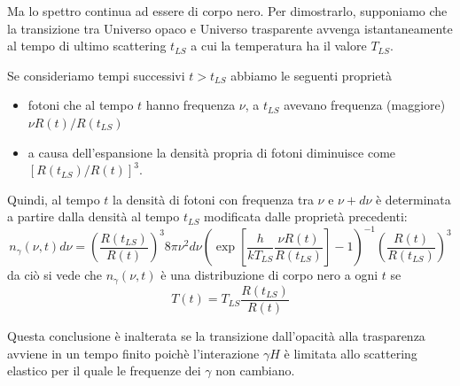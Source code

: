 Ma lo spettro continua ad essere di corpo nero. Per dimostrarlo, supponiamo che
la transizione tra Universo opaco e Universo trasparente avvenga istantaneamente
al tempo di ultimo scattering $t_{LS}$ a cui la temperatura ha il valore
$T_{LS}$.

Se consideriamo tempi successivi $t>t_{LS}$ abbiamo le seguenti proprietà
\begin{itemize}
\item fotoni che al tempo $t$ hanno frequenza $\nu$, a $t_{LS}$ avevano
  frequenza (maggiore) $\nu R(t)/R(t_{LS})$
\item a causa dell'espansione la densità propria di fotoni diminuisce come
  $[R(t_{LS})/R(t)]^3$.
\end{itemize}
Quindi, al tempo $t$ la densità di fotoni con frequenza tra $\nu$ e $\nu+d\nu$ è
determinata a partire dalla densità al tempo $t_{LS}$ modificata dalle proprietà
precedenti:
\begin{equation}
  n_{\gamma}(\nu, t) d\nu = \left( \frac {R(t_{LS})} {R(t)} \right)^3
  8 \pi \nu^2 d \nu
  \left( \exp \left[ \frac {h} {k T_{LS}} \frac{\nu R(t)}{R(t_{LS})} \right] -1
  \right)^{-1} \left( \frac {R(t)} {R(t_{LS})} \right)^3
\end{equation}
da ciò si vede che $n_{\gamma}(\nu,t)$ è una distribuzione di corpo nero a ogni
$t$ se
\begin{equation}
  T(t) = T_{LS} \frac {R(t_{LS})} {R(t)}
\end{equation}

Questa conclusione è inalterata se la transizione dall'opacità alla trasparenza
avviene in un tempo finito poichè l'interazione $\gamma H$ è limitata allo
scattering elastico per il quale le frequenze dei $\gamma$ non cambiano.

